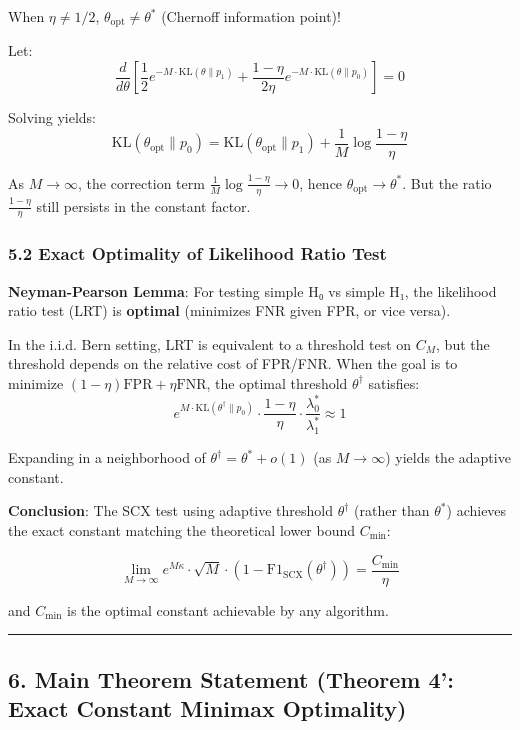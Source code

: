 \documentclass[
  12pt,
]{article}
\begin{document}
When \(\eta \neq 1/2\), \(\theta_{\text{opt}} \neq \theta^*\) (Chernoff information point)!

Let:
\[\frac{d}{d\theta}\left[\frac{1}{2}e^{-M \cdot \text{KL}(\theta \| p_1)} + \frac{1-\eta}{2\eta}e^{-M \cdot \text{KL}(\theta \| p_0)}\right] = 0\]

Solving yields:
\[\text{KL}(\theta_{\text{opt}} \| p_0) = \text{KL}(\theta_{\text{opt}} \| p_1) + \frac{1}{M}\log\frac{1-\eta}{\eta}\]

As \(M \to \infty\), the correction term \(\frac{1}{M}\log\frac{1-\eta}{\eta} \to 0\), hence \(\theta_{\text{opt}} \to \theta^*\). But the ratio \(\frac{1-\eta}{\eta}\) still persists in the constant factor.

\subsubsection{5.2 Exact Optimality of Likelihood Ratio Test}\label{exact-optimality-of-likelihood-ratio-test}

\textbf{Neyman-Pearson Lemma}: For testing simple H₀ vs simple H₁, the likelihood ratio test (LRT) is \textbf{optimal} (minimizes FNR given FPR, or vice versa).

In the i.i.d. Bern setting, LRT is equivalent to a threshold test on \(C_M\), but the threshold depends on the relative cost of FPR/FNR. When the goal is to minimize \((1-\eta)\text{FPR} + \eta\text{FNR}\), the optimal threshold \(\theta^\dagger\) satisfies:
\[e^{M \cdot \text{KL}(\theta^\dagger \| p_0)} \cdot \frac{1-\eta}{\eta} \cdot \frac{\lambda_0^*}{\lambda_1^*} \approx 1\]

Expanding in a neighborhood of \(\theta^\dagger = \theta^* + o(1)\) (as \(M\to\infty\)) yields the adaptive constant.

\textbf{Conclusion}: The SCX test using adaptive threshold \(\theta^\dagger\) (rather than \(\theta^*\)) achieves the exact constant matching the theoretical lower bound \(C_{\min}\):

\[\boxed{\lim_{M\to\infty} e^{M\kappa} \cdot \sqrt{M} \cdot (1 - \text{F1}_{\text{SCX}}(\theta^\dagger)) = \frac{C_{\min}}{\eta}}\]

and \(C_{\min}\) is the optimal constant achievable by any algorithm.

\begin{center}\rule{0.5\linewidth}{0.5pt}\end{center}

\subsection{6. Main Theorem Statement (Theorem 4': Exact Constant Minimax Optimality)}\label{main-theorem-statement}
\end{document}
